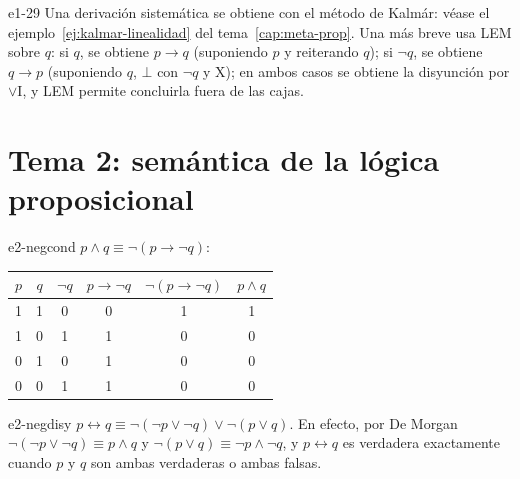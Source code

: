 \begin{solucion}{e1-29}
Una derivación sistemática se obtiene con el método de Kalmár: véase el ejemplo~\ref{ej:kalmar-linealidad} del tema~\ref{cap:meta-prop}. Una más breve usa LEM sobre $q$: si $q$, se obtiene $p \to q$ (suponiendo $p$ y reiterando $q$); si $\neg q$, se obtiene $q \to p$ (suponiendo $q$, $\bot$ con $\neg q$ y X); en ambos casos se obtiene la disyunción por $\lor$I, y LEM permite concluirla fuera de las cajas.
\end{solucion}

\section{Tema 2: semántica de la lógica proposicional}

\begin{solucion}{e2-negcond}
$p \land q \equiv \neg(p \to \neg q)$:
\begin{center}
\begin{tabular}{cc|c|c|c|c}
$p$ & $q$ & $\neg q$ & $p \to \neg q$ & $\neg(p \to \neg q)$ & $p \land q$ \\
\hline
1 & 1 & 0 & 0 & 1 & 1 \\
1 & 0 & 1 & 1 & 0 & 0 \\
0 & 1 & 0 & 1 & 0 & 0 \\
0 & 0 & 1 & 1 & 0 & 0
\end{tabular}
\end{center}
\end{solucion}

\begin{solucion}{e2-negdisy}
$p \leftrightarrow q \equiv \neg(\neg p \lor \neg q) \lor \neg(p \lor q)$. En efecto, por De Morgan $\neg(\neg p \lor \neg q) \equiv p \land q$ y $\neg(p \lor q) \equiv \neg p \land \neg q$, y $p \leftrightarrow q$ es verdadera exactamente cuando $p$ y $q$ son ambas verdaderas o ambas falsas.
\end{solucion}

